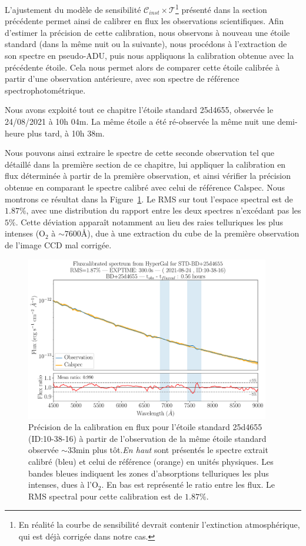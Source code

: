 \documentclass[../main/main.tex]{subfiles}
\begin{document}
L'ajustement du modèle de sensibilité $\mathcal{C}_{inst}\times\mathcal{T}$\footnote{En réalité la
  courbe de sensibilité devrait contenir l'extinction atmosphérique, qui
est déjà corrigée dans notre cas.} présenté dans la section
précédente permet ainsi de calibrer en flux les observations
scientifiques. Afin d'estimer la précision de cette calibration, nous
observons à nouveau une étoile standard (dans la même nuit ou la
suivante), nous procédons à l'extraction de son spectre en pseudo-ADU,
puis nous appliquons la calibration obtenue avec la précédente étoile.
Cela nous permet alors de comparer cette étoile calibrée à partir d'une
observation antérieure, avec son spectre de référence
spectrophotométrique.

Nous avons exploité tout ce chapitre l'étoile standard 25d4655, observée
le 24/08/2021 à 10h 04m. La même étoile a été ré-observée la même
nuit une demi-heure plus tard, à 10h 38m.

Nous pouvons ainsi extraire le spectre de cette seconde
observation tel que détaillé dans la première section de ce chapitre,
lui appliquer la calibration en flux déterminée à partir de la première
observation, et ainsi vérifier la précision obtenue en comparant le
spectre calibré avec celui de référence Calspec.
Nous montrons ce résultat dans la Figure~\ref{fig:fluxcalstd}.
Le RMS sur tout l'espace spectral est de $1.87\%$, avec une distribution
du rapport entre les deux spectres n'excédant pas les $5\%$. Cette
déviation apparaît notamment au lieu des raies telluriques les
plus intenses (O$_{2}$ à $\sim7600$\AA), due à une extraction du cube de
la première observation de l'image CCD mal corrigée.
\begin{figure}[ht]
  \centering
  \includegraphics[width=0.95\textwidth]{../figures/06_irf/fluxcalstd.pdf}
  \caption[Précision de la calibration en flux pour une étoile
  standard.]{Précision de la calibration en flux pour l'étoile standard
    25d4655 (ID:10-38-16) à partir de l'observation de la même étoile standard
    observée $\sim33$min plus tôt.\emph{En haut} sont présentés le
    spectre extrait calibré (bleu) et celui de référence (orange) en
    unités physiques. Les bandes bleues indiquent les zones
    d'absorptions telluriques les plus intenses, dues à l'O$_{2}$. En
    bas est représenté le ratio entre les flux. Le RMS spectral pour
    cette calibration est de $1.87\%$.}
  \label{fig:fluxcalstd}
\end{figure}
\end{document}
